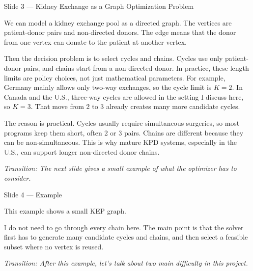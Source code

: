\documentclass[11pt, aspectratio=169]{beamer}
\newcommand{\tr}[1]{\vspace{0.35em}\textit{\textcolor{black!55}{Transition: #1}}}
\newcommand{\timing}[1]{}
\begin{document}
\begin{frame}{Slide 3 \enspace\textmd{\small\textcolor{black!40}{--- Kidney Exchange as a Graph Optimization Problem}}}
\footnotesize
\timing{45 seconds}

We can model a kidney exchange pool as a directed graph. The vertices are
patient-donor pairs and non-directed donors. The edge means that the donor from
one vertex can donate to the patient at another vertex.

\vspace{0.35em}
Then the decision problem is to select cycles and chains. Cycles use only
patient-donor pairs, and chains start from a non-directed donor. In practice,
these length limits are policy choices, not just mathematical parameters.
For example, Germany mainly allows only two-way exchanges, so the cycle limit is
\(K=2\). In Canada and the U.S., three-way cycles are allowed in the setting I
discuss here, so \(K=3\). That move from 2 to 3 already creates many more
candidate cycles.

\vspace{0.35em}
The reason is practical. Cycles usually require simultaneous surgeries, so most
programs keep them short, often 2 or 3 pairs. Chains are different because they
can be non-simultaneous. This is why mature KPD systems, especially in the U.S.,
can support longer non-directed donor chains.

\tr{The next slide gives a small example of what the optimizer has to consider.}
\end{frame}

\begin{frame}{Slide 4 \enspace\textmd{\small\textcolor{black!40}{--- Example}}}
\small
\timing{25 seconds}

This example shows a small KEP graph.

\vspace{0.35em}
I do not need to go through every chain here. The main point is that the solver
first has to generate many candidate cycles and chains, and then select a
feasible subset where no vertex is reused.

\tr{After this example, let's talk about two main difficulty in this project.}
\end{frame}
\end{document}
